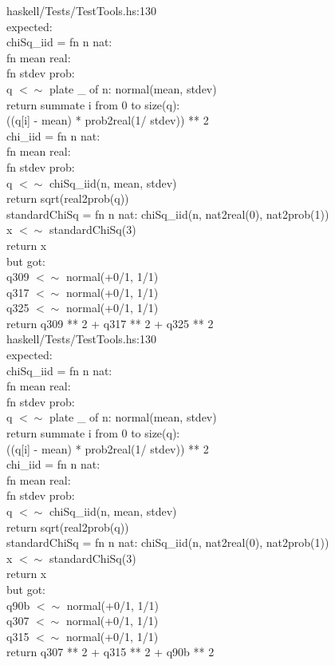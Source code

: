 \documentclass[11pt]{article}
\begin{document}
\bigskip
\noindent
haskell/Tests/TestTools.hs:130\\expected:\\chiSq\_iid = fn n nat:\\            fn mean real:\\            fn stdev prob:\\            q $<\sim$ plate \_ of n: normal(mean, stdev)\\            return summate i from 0 to size(q):\\                   ((q[i] - mean) * prob2real(1/ stdev)) ** 2\\chi\_iid = fn n nat:\\          fn mean real:\\          fn stdev prob:\\          q $<\sim$ chiSq\_iid(n, mean, stdev)\\          return sqrt(real2prob(q))\\standardChiSq = fn n nat: chiSq\_iid(n, nat2real(0), nat2prob(1))\\x $<\sim$ standardChiSq(3)\\return x\\but got:\\q309 $<\sim$ normal(+0/1, 1/1)\\q317 $<\sim$ normal(+0/1, 1/1)\\q325 $<\sim$ normal(+0/1, 1/1)\\return q309 ** 2 + q317 ** 2 + q325 ** 2\\

\bigskip
\noindent
haskell/Tests/TestTools.hs:130\\expected:\\chiSq\_iid = fn n nat:\\            fn mean real:\\            fn stdev prob:\\            q $<\sim$ plate \_ of n: normal(mean, stdev)\\            return summate i from 0 to size(q):\\                   ((q[i] - mean) * prob2real(1/ stdev)) ** 2\\chi\_iid = fn n nat:\\          fn mean real:\\          fn stdev prob:\\          q $<\sim$ chiSq\_iid(n, mean, stdev)\\          return sqrt(real2prob(q))\\standardChiSq = fn n nat: chiSq\_iid(n, nat2real(0), nat2prob(1))\\x $<\sim$ standardChiSq(3)\\return x\\but got:\\q90b $<\sim$ normal(+0/1, 1/1)\\q307 $<\sim$ normal(+0/1, 1/1)\\q315 $<\sim$ normal(+0/1, 1/1)\\return q307 ** 2 + q315 ** 2 + q90b ** 2\\
\end{document}
